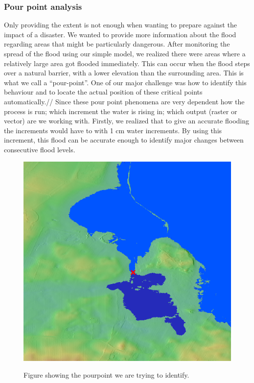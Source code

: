 \subsubsection{Pour point analysis}
Only providing the extent is not enough when wanting to prepare against the impact of a disaster. We wanted to provide more information about the flood regarding areas that might be particularly dangerous. After monitoring the  spread of the flood using our simple model, we realized there were areas where a relatively large area got flooded immediately. This can occur when the flood steps over a natural barrier, with a lower elevation than the surrounding area. This is what we call a “pour-point”. One of our major challenge was how to identify this behaviour and to locate the actual position of these critical points automatically.// 
Since these pour point phenomena are very dependent how the process is run; which increment the water is rising in; which output (raster or vector) are we working with. Firstly, we realized that to give an accurate flooding the increments would have to with 1 cm water increments. By using this increment, this flood can be accurate enough to identify major changes between consecutive flood levels.

\begin{figure}[h!]
\centering
	{\includegraphics[width=0.80\linewidth]{gfx/Pourpoint.png}}
\caption{Figure showing the pourpoint we are trying to identify.}
\label{fig:pourpoint}
\end{figure}

